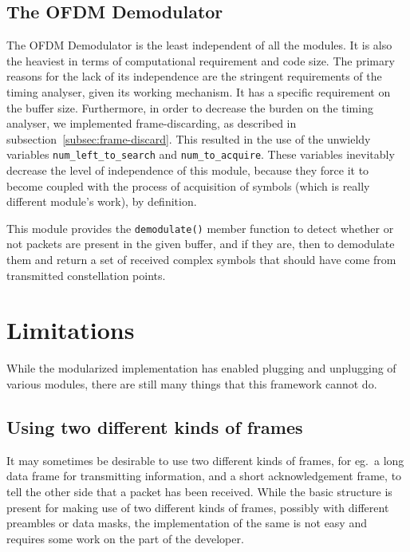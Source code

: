 \subsection{The OFDM Demodulator}

The OFDM Demodulator is the least independent of all the modules. It is also
the heaviest in terms of computational requirement and code size. The primary
reasons for the lack of its independence are the stringent requirements of the
timing analyser, given its working mechanism. It has a specific requirement on
the buffer size. Furthermore, in order to decrease the burden on the timing
analyser, we implemented frame-discarding, as described in
subsection~\ref{subsec:frame-discard}. This resulted in the use of the
unwieldy variables \lstinline!num_left_to_search! and
\lstinline!num_to_acquire!. These variables inevitably decrease the level of
independence of this module, because they force it to become coupled with the
process of acquisition of symbols (which is really different module's work), by
definition.

This module provides the \lstinline!demodulate()! member function to detect
whether or not packets are present in the given buffer, and if they are, then
to demodulate them and return a set of received complex symbols that should
have come from transmitted constellation points.


\section{Limitations}

While the modularized implementation has enabled plugging and unplugging of
various modules, there are still many things that this framework cannot do.

\subsection{Using two different kinds of frames}

It may sometimes be desirable to use two different kinds of frames, for eg.\ a
long data frame for transmitting information, and a short acknowledgement
frame, to tell the other side that a packet has been received. While the basic
structure is present for making use of two different kinds of frames, possibly
with different preambles or data masks, the implementation of the same is not
easy and requires some work on the part of the developer.


